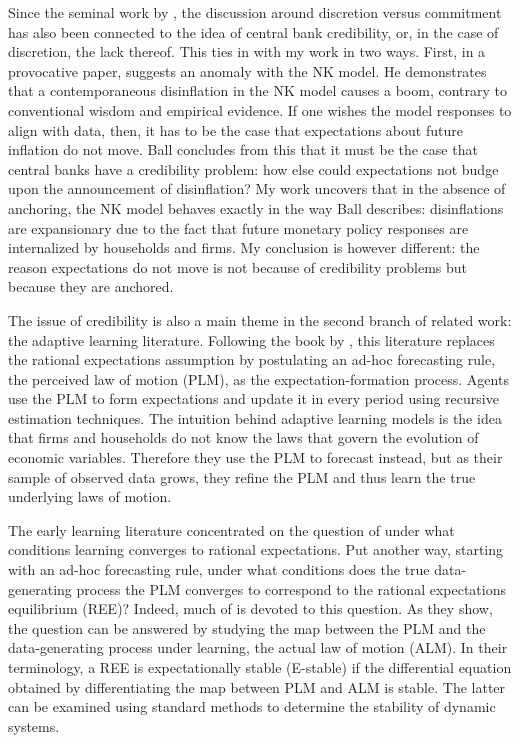 \documentclass[11pt]{article}
\renewcommand{\[}{\begin{equation}}
\renewcommand{\]}{\end{equation}}
\begin{document}
Since the seminal work by \cite{barro1983rules}, the discussion around discretion versus commitment has also been connected to the idea of central bank credibility, or, in the case of discretion, the lack thereof. This ties in with my work in two ways. First, in a provocative paper, \cite{ball1994credible} suggests an anomaly with the NK model. He demonstrates that a contemporaneous disinflation in the NK model causes a boom, contrary to conventional wisdom and empirical evidence. If one wishes the model responses to align with data, then, it has to be the case that expectations about future inflation do not move. Ball concludes from this that it must be the case that central banks have a credibility problem: how else could expectations not budge upon the announcement of disinflation? My work uncovers that in the absence of anchoring, the NK model behaves exactly in the way Ball describes: disinflations are expansionary due to the fact that future monetary policy responses are internalized by households and firms. My conclusion is however different: the reason expectations do not move is not because of credibility problems but because they are anchored. 

The issue of credibility is also a main theme in the second branch of related work: the adaptive learning literature. Following the book by \cite{evans_honkapohja2001}, this literature replaces the rational expectations assumption by postulating an ad-hoc forecasting rule, the perceived law of motion (PLM), as the expectation-formation process. Agents use the PLM to form expectations and update it in every period using recursive estimation techniques. The intuition behind adaptive learning models is the idea that firms and households do not know the laws that govern the evolution of economic variables. Therefore they use the PLM to forecast instead, but as their sample of observed data grows, they refine the PLM and thus learn the true underlying laws of motion. 

The early learning literature concentrated on the question of under what conditions learning converges to rational expectations. Put another way, starting with an ad-hoc forecasting rule, under what conditions does the true data-generating process the PLM converges to correspond to the rational expectations equilibrium (REE)? Indeed, much of \cite{evans_honkapohja2001} is devoted to this question. As they show, the question can be answered by studying the map between the PLM and the data-generating process under learning, the actual law of motion (ALM). In their terminology, a REE is expectationally stable (E-stable) if the differential equation obtained by differentiating the map between PLM and ALM is stable. The latter can be examined using standard methods to determine the stability of dynamic systems.
\end{document}
